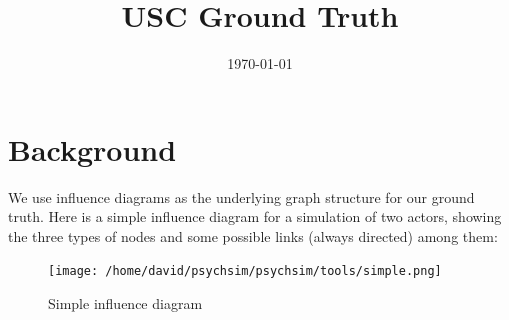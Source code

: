 \documentclass{article}%
\title{USC Ground Truth}%
\date{\today}%
\begin{document}
%
\normalsize%
\maketitle%
\clearpage%
\tableofcontents%
\clearpage%
\section{Background}%
\label{sec:Background}%
We use influence diagrams as the underlying graph structure for our ground truth. Here is a simple influence diagram for a simulation of two actors, showing the three types of nodes and some possible links (always directed) among them:%


\begin{figure}[ht]%
\centering%
\texttt{[image: /home/david/psychsim/psychsim/tools/simple.png]}%
\caption{Simple influence diagram}%
\end{figure}
\end{document}
